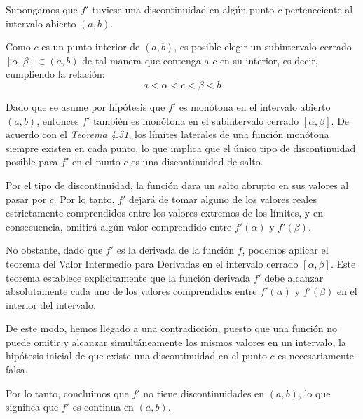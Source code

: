 \begin{prueba}
    Supongamos que $f'$ tuviese una discontinuidad en algún punto $c$ perteneciente al intervalo abierto $(a, b)$. 
	
	Como $c$ es un punto interior de $(a, b)$, es posible elegir un subintervalo cerrado $[\alpha, \beta] \subset (a, b)$ de tal manera que contenga a $c$ en su interior, es decir, cumpliendo la relación:
	\[a < \alpha < c < \beta < b\]
	
	Dado que se asume por hipótesis que $f'$ es monótona en el intervalo abierto $(a, b)$, entonces $f'$ también es monótona en el subintervalo cerrado $[\alpha, \beta]$. De acuerdo con el \textit{Teorema 4.51}, los límites laterales de una función monótona siempre existen en cada punto, lo que implica que el único tipo de discontinuidad posible para $f'$ en el punto $c$ es una discontinuidad de salto.
	
	Por el tipo de discontinuidad, la función dara un salto abrupto en sus valores al pasar por $c$. Por lo tanto, $f'$ dejará de tomar alguno de los valores reales estrictamente comprendidos entre los valores extremos de los límites, y en consecuencia, omitirá algún valor comprendido entre $f'(\alpha)$ y $f'(\beta)$.
	
	No obstante, dado que $f'$ es la derivada de la función $f$, podemos aplicar el teorema del Valor Intermedio para Derivadas en el intervalo cerrado $[\alpha, \beta]$. Este teorema establece explícitamente que la función derivada $f'$ debe alcanzar absolutamente cada uno de los valores comprendidos entre $f'(\alpha)$ y $f'(\beta)$ en el interior del intervalo.
	
	De este modo, hemos llegado a una contradicción, puesto que una función no puede omitir y alcanzar simultáneamente los mismos valores en un intervalo, la hipótesis inicial de que existe una discontinuidad en el punto $c$ es necesariamente falsa.
	
	Por lo tanto, concluimos que $f'$ no tiene discontinuidades en $(a, b)$, lo que significa que $f'$ es continua en $(a, b)$.

\end{prueba}
